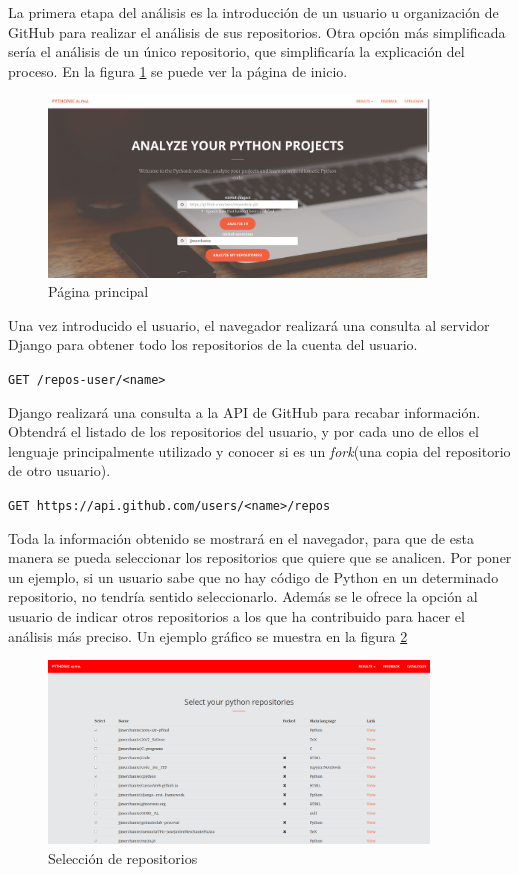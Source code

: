 \documentclass[a4paper, 12pt]{book}
\begin{document}
La primera etapa del análisis es la introducción de un usuario u organización de GitHub para realizar el análisis de sus repositorios. Otra opción más simplificada sería el análisis de un único repositorio, que simplificaría la explicación del proceso. En la figura \ref{fig:inicio} se puede ver la página de inicio. 

\begin{figure}
    \centering
    \includegraphics[width=0.9\textwidth]{img/1inicio.png}
    \caption{Página principal}
    \label{fig:inicio}
\end{figure}

Una vez introducido el usuario, el navegador realizará una consulta al servidor Django para obtener todo los repositorios de la cuenta del usuario. 

\texttt{GET /repos-user/<name>}

Django realizará una consulta a la API de GitHub para recabar información. Obtendrá el listado de los repositorios del usuario, y por cada uno de ellos el lenguaje principalmente utilizado y conocer si es un \textit{fork}(una copia del repositorio de otro usuario).

\texttt{GET https://api.github.com/users/<name>/repos}

Toda la información obtenido se mostrará en el navegador, para que de esta manera se pueda seleccionar los repositorios que quiere que se analicen. Por poner un ejemplo, si un usuario sabe que no hay código de Python en un determinado repositorio, no tendría sentido seleccionarlo. Además se le ofrece la opción al usuario de indicar otros repositorios a los que ha contribuido para hacer el análisis más preciso. Un ejemplo gráfico se muestra en la figura \ref{fig:pediruser}

\begin{figure}
    \centering
    \includegraphics[width=0.9\textwidth]{img/1seleccionar.png}
    \caption{Selección de repositorios}
    \label{fig:pediruser}
\end{figure}
\end{document}
